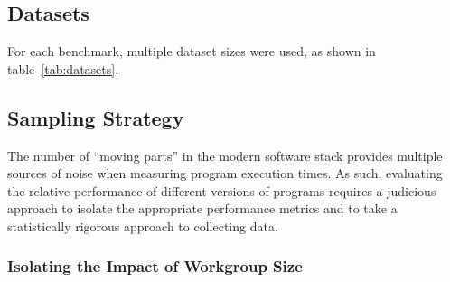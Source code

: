 \subsection{Datasets}

For each benchmark, multiple dataset sizes were used, as shown in
table~\ref{tab:datasets}.

\begin{table}

\caption[Description of experimental datasets]{%
  Description of experimental datasets.%
}
\label{tab:datasets}
\end{table}


\subsection{Sampling Strategy}\label{sec:sampling}

The number of ``moving parts'' in the modern software stack provides
multiple sources of noise when measuring program execution times. As
such, evaluating the relative performance of different versions of
programs requires a judicious approach to isolate the appropriate
performance metrics and to take a statistically rigorous approach to
collecting data.

\subsubsection{Isolating the Impact of Workgroup Size}

\begin{table}

\caption[SkelCL stencil execution phases]{%
  Execution phases of a SkelCL stencil skeleton. ``Fixed''
  costs are those which occur up to once per stencil
  invocation. ``Iterative'' costs are those which scale with the
  number of iterations of a stencil.%
}
\label{tab:stencil-runtime-components}
\end{table}

